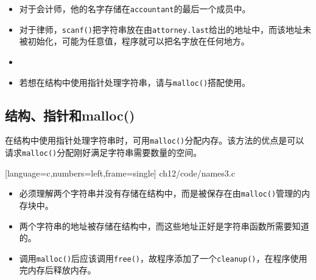 \begin{frame}[fragile]\ft{\subsecname}
\begin{itemize}
\item 对于会计师，他的名字存储在\verb|accountant|的最后一个成员中。\\[0.1in]
\item 对于律师，\verb|scanf()|把字符串放在由\verb|attorney.last|给出的地址中，而该地址未被初始化，可能为任意值，程序就可以把名字放在任何地方。
\end{itemize}
\end{frame}

\begin{frame}[fragile]\ft{\subsecname}
  \begin{itemize}
  \item {} \\[0.1in]
  \item 若想在结构中使用指针处理字符串，请与\verb|malloc()|搭配使用。
  \end{itemize}
\end{frame}

\subsection{结构、指针和malloc()}
\begin{frame}[fragile]\ft{\subsecname}
在结构中使用指针处理字符串时，可用\verb|malloc()|分配内存。该方法的优点是可以请求\verb|malloc()|分配刚好满足字符串需要数量的空间。
\end{frame}

\begin{frame}\ft{\subsecname}
  
  [language=c,numbers=left,frame=single]  
  {ch12/code/names3.c}
\end{frame}



\begin{frame}[fragile]\ft{\subsecname}
  \begin{itemize}
  \item 必须理解两个字符串并没有存储在结构中，而是被保存在由\verb|malloc()|管理的内存块中。\\[0.1in]
  \item 两个字符串的地址被存储在结构中，而这些地址正好是字符串函数所需要知道的。\\[0.1in]
  \item 调用\verb|malloc()|后应该调用\verb|free()|，故程序添加了一个\verb|cleanup()|，在程序使用完内存后释放内存。
  \end{itemize}
\end{frame}
